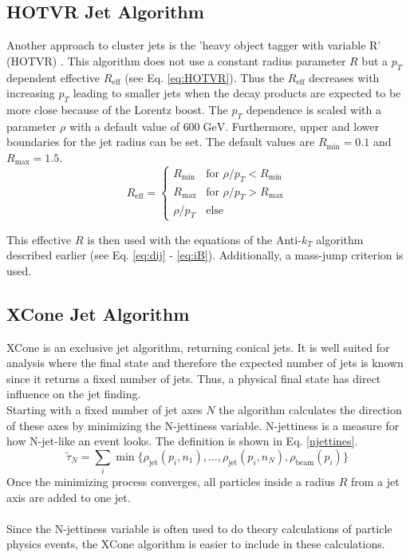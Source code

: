 \subsection{HOTVR Jet Algorithm}
	Another approach to cluster jets is the 'heavy object tagger with variable R' (HOTVR) \cite{hotvr}. This algorithm does not use a constant radius parameter $R$ but a $p_T$ dependent effective $R_\text{eff}$ (see Eq. \ref{eq:HOTVR}). Thus the $R_\text{eff}$ decreases with increasing $p_T$ leading to smaller jets when the decay products are expected to be more close because of the Lorentz boost. The $p_T$ dependence is scaled with a parameter $\rho$ with a default value of $600\;\text{GeV}$. Furthermore, upper and lower boundaries for the jet radius can be set. The default values are $R_\text{min} = 0.1$ and $R_\text{max} = 1.5$. 	
	\begin{equation}
	\label{eq:HOTVR}
	  R_\text{eff} =
	   \begin{cases}
	     R_\text{min} & \text{for } \rho / p_T < R_\text{min} \\
	     R_\text{max} & \text{for } \rho / p_T > R_\text{max} \\
	     \rho / p_T & \text{else}  
	   \end{cases}
	\end{equation}
	
	\noindent This effective $R$ is then used with the equations of the Anti-$k_T$ algorithm described earlier (see Eq. \ref{eq:dij} - \ref{eq:iB}). Additionally, a mass-jump criterion is used.
	

\subsection{XCone Jet Algorithm}
\label{sec:xcone}
	XCone \cite{xcone} is an exclusive jet algorithm, returning conical jets. It is well suited for analysis where the final state and therefore the expected number of jets is known since it returns a fixed number of jets. Thus, a physical final state has direct influence on the jet finding. \\
	Starting with a fixed number of jet axes $N$ the algorithm calculates the direction of these axes by minimizing the N-jettiness variable. N-jettiness is a measure for how N-jet-like an event looks. The definition is shown in Eq. \ref{njettines}.
	\begin{equation}
	\tilde{\tau}_N = \sum_i \min\{\rho_\text{jet}(p_i, n_1), \dots, \rho_\text{jet}(p_i, n_N), \rho_\text{beam}(p_i)\}
	\label{njettines}
	\end{equation}
	Once the minimizing process converges, all particles inside a radius $R$ from a jet axis are added to one jet. \\	
	\\ Since the N-jettiness variable is often used to do theory calculations of particle physics events, the XCone algorithm is easier to include in these calculations.

